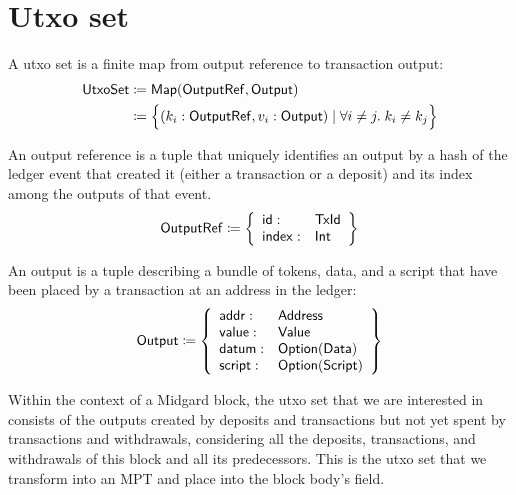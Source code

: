 \documentclass[../midgard.tex]{subfiles}
\begin{document}
\section{Utxo set}
\label{h:utxo-set}

A utxo set is a finite map from output reference to transaction output:
\begin{align*}
    \mathsf{UtxoSet} &\coloneq \mathsf{Map(OutputRef, Output)} \\
      &\coloneq \Bigl\{
        (k_i: \mathsf{OutputRef}, v_i: \mathsf{Output}) \mid \forall i \neq j.\; k_i \neq k_j
    \Bigr\}
\end{align*}

An output reference is a tuple that uniquely identifies an output by a hash of the ledger event that created it (either a transaction or a deposit) and its index among the outputs of that event.
\begin{equation*}
    \mathsf{OutputRef} \coloneq \left\{
    \begin{array}{ll}
        \mathsf{id} : & \mathsf{TxId} \\
        \mathsf{index} : & \mathsf{Int}
    \end{array} \right\}
\end{equation*}

An output is a tuple describing a bundle of tokens, data, and a script that have been placed by a transaction at an address in the ledger:
\begin{equation*}
    \mathsf{Output} \coloneq \left\{
    \begin{array}{ll}
        \mathsf{addr} : & \mathsf{Address} \\
        \mathsf{value} : & \mathsf{Value} \\
        \mathsf{datum} : & \mathsf{Option(Data)} \\
        \mathsf{script} : & \mathsf{Option(Script)}
    \end{array} \right\}
\end{equation*}

Within the context of a Midgard block, the utxo set that we are interested in consists of the outputs created by deposits and transactions but not yet spent by transactions and withdrawals, considering all the deposits, transactions, and withdrawals of this block and all its predecessors.
This is the utxo set that we transform into an MPT and place into the block body's  field.


\todo

\todo
\end{document}
